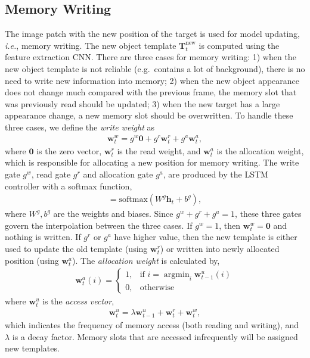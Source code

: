\documentclass[runningheads]{llncs}
\newcommand{\yty}[1]{\textcolor{black}{#1}}
\begin{document}

\subsection{Memory Writing}

The image patch with the new position of the target is used for model updating, \emph{i.e.}, memory writing.
The new object template $\mathbf{T}^{\text{new}}_t$ is computed using the feature extraction CNN. There are three cases for memory writing: 1) when the new object template is not reliable (e.g.\ contains a lot of background), there is no need to write new information into memory; 2) when the new object appearance does not change much compared with the previous frame, the memory slot that was previously read should be updated; %
3) when the new target has a large appearance change, a new memory slot should be overwritten.
To handle these three cases, we define the \textit{write weight} as
\begin{align}
\mathbf{w}^w_t =g^w\mathbf{0}+g^r\mathbf{w}^r_t + g^a\mathbf{w}^a_t, 
\end{align}
where $\mathbf{0}$ is the zero vector, $\mathbf{w}^r_t$ is the read weight, and $\mathbf{w}^a_t$  is the allocation weight, which is responsible for allocating a new position for memory writing. 
The write gate $g^w$, read gate $g^r$ and allocation gate $g^a$, are produced by the LSTM controller with a softmax function, 
\begin{align}
[g^w, g^r, g^a] = \text{softmax}(W^g \mathbf{h}_{t}+b^g),
\end{align}
where $W^g, b^g$ are the weights and biases. Since $g^w+g^r+g^a=1$, these three gates govern the interpolation between the three cases.  If $g^w=1$, then $\mathbf{w}^w_t=\mathbf{0}$ and nothing is written.  If $g^r$ or $g^a$ have higher value, then the new template is either used to update the old template (using $\mathbf{w}^r_t$) or written into newly allocated position (using $\mathbf{w}^a_t$). The \textit{allocation weight} is calculated by,
\begin{align}
\mathbf{w}^a_t(i)=
\begin{cases}
1, &\text{if } i=\displaystyle \mathop{\mathrm{argmin}}_{i} \mathbf{w}^u_{t-1}(i)\\
0, &\text{otherwise}
\end{cases}
\end{align}
where $\mathbf{w}^u_t$ is the \textit{access vector},
\begin{align}
\mathbf{w}^u_t = \lambda \mathbf{w}^u_{t-1} + \mathbf{w}^r_t + \mathbf{w}^w_t,
\end{align}
which indicates the frequency of memory access (both reading and writing), and $\lambda$ is a decay factor. Memory slots that are accessed infrequently will be assigned new templates.  
\end{document}

